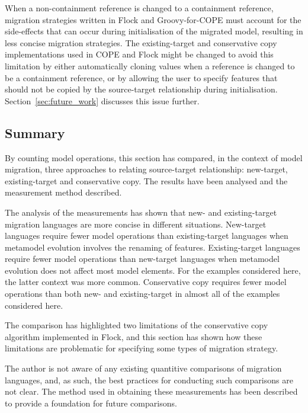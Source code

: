 When a non-containment reference is changed to a containment reference, migration strategies written in Flock and Groovy-for-COPE must account for the side-effects that can occur during initialisation of the migrated model, resulting in less concise migration strategies. The existing-target and conservative copy implementations used in COPE and Flock might be changed to avoid this limitation by either automatically cloning values when a reference is changed to be a containment reference, or by allowing the user to specify features that should not be copied by the source-target relationship during initialisation. Section~\ref{sec:future_work} discusses this issue further. 

\subsection{Summary}
By counting model operations, this section has compared, in the context of model migration, three approaches to relating source-target relationship: new-target, existing-target and conservative copy. The results have been analysed and the measurement method described.

The analysis of the measurements has shown that new- and existing-target migration languages are more concise in different situations. New-target languages require fewer model operations than existing-target languages when metamodel evolution involves the renaming of features. Existing-target languages require fewer model operations than new-target languages when metamodel evolution does not affect most model elements. For the examples considered here, the latter context was more common. Conservative copy requires fewer model operations than both new- and existing-target in almost all of the examples considered here.

The comparison has highlighted two limitations of the conservative copy algorithm implemented in Flock, and this section has shown how these limitations are problematic for specifying some types of migration strategy.

The author is not aware of any existing quantitive comparisons of migration languages, and, as such, the best practices for conducting such comparisons are not clear. The method used in obtaining these measurements has been described to provide a foundation for future comparisons. 
